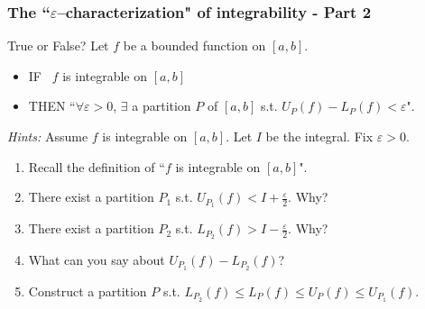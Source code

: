 \documentclass[14pt]{beamer}
\begin{document}
\begin{frame}[t]
	\fontsize{11}{11}\selectfont
	\frametitle{The ``$\varepsilon$--characterization" of integrability - Part 2}

	\begin{block}{\fontsize{11}{11}\selectfont True or False?}
		Let $f$ be a bounded function on $[a,b]$.
		\begin{itemize}
			\item IF \quad \quad \, $f$ is integrable on $[a,b]$

			\item THEN \hfill ``$\forall \varepsilon>0$, $\exists$ a partition $P$ of
				$[a,b]$ s.t. $\displaystyle U_{P}(f) - L_{P}(f) < \varepsilon$".
		\end{itemize}
	\end{block}

	\emph{Hints:} Assume $f$ is integrable on $[a,b]$. Let $I$ be the integral. Fix
	$\varepsilon>0$.
	\begin{enumerate}
		\item Recall the definition of ``$f$ is integrable on $[a,b]$".

		\item There exist a partition $P_{1}$ s.t.
			$\displaystyle U_{P_1}(f) < I + \frac{\varepsilon}{2}$. Why?

		\item There exist a partition $P_{2}$ s.t.
			$\displaystyle L_{P_2}(f) > I - \frac{\varepsilon}{2}$. Why?

		\item What can you say about $\displaystyle U_{P_1}(f) - L_{P_2}(f)$?
			\vspace{.1cm}

		\item Construct a partition $P$ s.t.
			$\displaystyle L_{P_2}(f) \leq L_{P}(f) \leq U_{P}(f) \leq U_{P_1}(f)$.
	\end{enumerate}
\end{frame}
\end{document}
